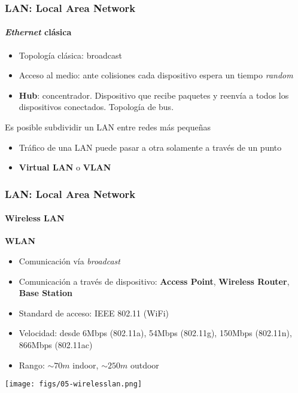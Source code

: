 \documentclass[letter]{beamer}
\begin{document}
\begin{frame}
  \frametitle{LAN: Local Area Network}
  \framesubtitle{{\em Ethernet} clásica}
  
  \begin{itemize}
    \item Topología clásica: broadcast
    \item Acceso al medio: ante colisiones cada dispositivo espera un tiempo {\em random}
    \item {\bf Hub}: concentrador. Dispositivo que recibe paquetes y reenvía a todos los dispositivos
          conectados. Topología de bus.
  \end{itemize}
  Es posible subdividir un LAN entre redes más pequeñas
  \begin{itemize}
    \item Tráfico de una LAN puede pasar a otra solamente a través de un punto
    \item {\bf Virtual LAN} o {\bf VLAN}
  \end{itemize}

\end{frame}
\begin{frame}
  \frametitle{LAN: Local Area Network}
  \framesubtitle{Wireless LAN}

  {\bf WLAN}
  
  \begin{itemize}
    \item Comunicación vía {\em broadcast}
    \item Comunicación a través de dispositivo: {\bf Access Point}, {\bf Wireless Router}, {\bf Base Station}
    \item Standard de acceso: IEEE 802.11 (WiFi)
    \item Velocidad: desde 6Mbps (802.11a), 54Mbps (802.11g), 150Mbps (802.11n), 866Mbps (802.11ac)
    \item Rango: $\sim 70m$ indoor, $\sim 250m$ outdoor
  \end{itemize}

  \begin{center}
    \texttt{[image: figs/05-wirelesslan.png]}
  \end{center}

\end{frame}
\end{document}
